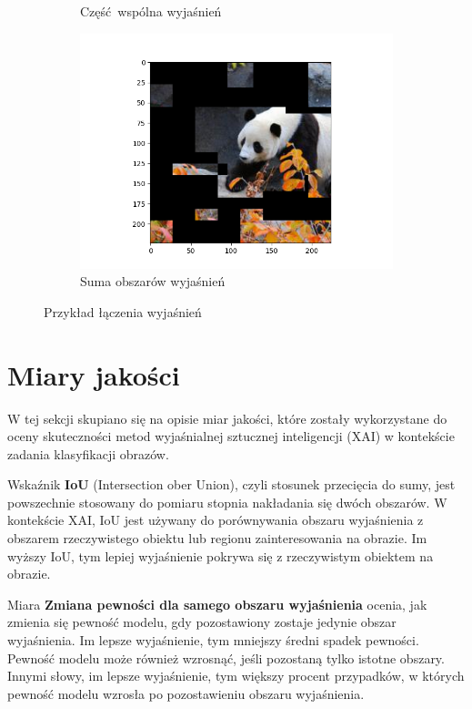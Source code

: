 \begin{figure}
\begin{subfigure}[b]{0.45\textwidth}
		\caption{Część wspólna wyjaśnień}  \label{}
	\end{subfigure}
	\begin{subfigure}[b]{0.45\textwidth}
		\centering\includegraphics[width=.9\textwidth]{img/examples/or_explanation}
		\caption{Suma obszarów wyjaśnień}  \label{}
	\end{subfigure}
	\caption{Przykład łączenia wyjaśnień} \label{rys:test}
\end{figure}

\section*{Miary jakości}

W tej sekcji skupiano się na opisie miar jakości, które zostały wykorzystane do oceny skuteczności metod wyjaśnialnej sztucznej inteligencji (XAI) w kontekście zadania klasyfikacji obrazów.

Wskaźnik \textbf{IoU} (Intersection ober Union), czyli stosunek przecięcia do sumy, jest powszechnie stosowany do pomiaru stopnia nakładania się dwóch obszarów.
W kontekście XAI, IoU jest używany do porównywania obszaru wyjaśnienia z obszarem rzeczywistego obiektu lub regionu zainteresowania na obrazie.
Im wyższy IoU, tym lepiej wyjaśnienie pokrywa się z rzeczywistym obiektem na obrazie.

Miara \textbf{Zmiana pewności dla samego obszaru wyjaśnienia} ocenia, jak zmienia się pewność modelu, gdy pozostawiony zostaje jedynie obszar wyjaśnienia.
Im lepsze wyjaśnienie, tym mniejszy średni spadek pewności. Pewność modelu może również wzrosnąć, jeśli pozostaną tylko istotne obszary.
Innymi słowy, im lepsze wyjaśnienie, tym większy procent przypadków, w których pewność modelu wzrosła po pozostawieniu obszaru wyjaśnienia.

